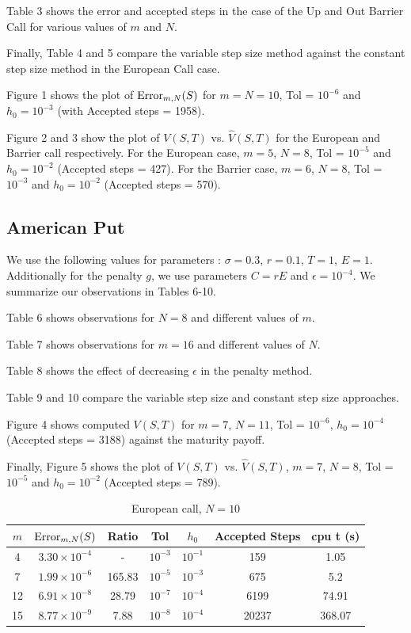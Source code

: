 \documentclass[a4paper,12pt]{article}
\begin{document}
Table 3 shows the error and accepted steps in the case of the Up and Out Barrier Call for various values of $m$ and $N$. 

Finally, Table 4 and 5 compare the variable step size method against the constant step size method in the European Call case.

Figure 1 shows the plot of $\operatorname{Error}_{m,N}(S)$ for $m = N = 10$, Tol = $10^{-6}$ and $h_0 = 10^{-3}$ (with Accepted steps = 1958). 

Figure 2 and 3 show the plot of $V(S,T)$ vs. $\hat{V}(S, T)$ for the European and Barrier call respectively. For the European case, $m = 5$, $N = 8$, Tol = $10^{-5}$ and $h_0 = 10^{-2}$ (Accepted steps = 427). For the Barrier case, $m = 6$, $N = 8$, Tol = $10^{-3}$ and $h_0 = 10^{-2}$ (Accepted steps = 570).  

\subsection{American Put}
We use the following values for parameters : $\sigma = 0.3$, $r = 0.1$, $T = 1$, $E = 1$. Additionally for the penalty $g$, we use parameters $C = rE$ and $\epsilon = 10^{-4}$. We summarize our observations in Tables 6-10.

Table 6 shows observations for $N = 8$ and different values of $m$.

Table 7 shows observations for $m = 16$ and different values of $N$.

Table 8 shows the effect of decreasing $\epsilon$ in the penalty method.

Table 9 and 10 compare the variable step size and constant step size approaches.

Figure 4 shows computed $V(S,T)$ for $m = 7$, $N = 11$, Tol = $10^{-6}$, $h_0 = 10^{-4}$ (Accepted steps = 3188) against the maturity payoff.

Finally, Figure 5 shows the plot of $V(S,T)$ vs. $\hat{V}(S, T)$, $m = 7$, $N = 8$, Tol = $10^{-5}$ and $h_0 = 10^{-2}$ (Accepted steps = 789).


 \begin{table}
 \begin{center}
 \caption{European call, $N = 10$}
 \begin{tabular}{||c c c c c c c||} 
 \hline
 $m$ & $\operatorname{Error}_{m,N}(S)$ & Ratio & Tol & $h_0$ & Accepted Steps & cpu t (s) \\ [0.5ex] 
 \hline\hline
 4 & $3.30 \times 10^{-4}$ & - & $10^{-3}$ & $10^{-1}$ & 159 & 1.05\\ 
 \hline
 7 & $1.99 \times 10^{-6}$ & 165.83 & $10^{-5}$ & $10^{-3}$ & 675 &  5.2\\
 \hline
 12 & $6.91 \times 10^{-8}$ & 28.79 & $10^{-7}$ & $10^{-4}$ & 6199 & 74.91 \\
 \hline
 15 & $8.77 \times 10^{-9}$ & 7.88 & $10^{-8}$ & $10^{-4}$ & 20237 & 368.07 \\
 \hline
\end{tabular}
\end{center}
\end{table}
\end{document}
